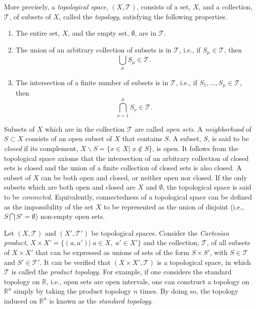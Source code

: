 \documentclass[
12pt,		%
openright,	%
twoside,  %
a4paper,			%
chapter=TITLE,		%
english,			%
french,				%
spanish,			%
brazil				%
]{USPSC-classe/USPSC}
\begin{document}
\begin{apendicesenv}
More precisely, a \textit{topological space}, $(X,\mathscr{T})$, consists of a set, $X$, and a collection, $\mathscr{T}$, of subsets of $X$, called the \textit{topology}, satisfying the following properties.
\begin{enumerate}
    \item[(1)] The entire set, $X$, and the empty set, $\emptyset$, are in $\mathscr{T}$.
    \item[(2)] The union of an arbitrary collection of subsets is in $\mathscr{T}$, i.e., if $S_{\mu}\in\mathscr{T}$, then $$\bigcup_{\mu}S_{\mu}\in\mathscr{T}.$$
    \item[(3)] The intersection of a finite number of subsets is in $\mathscr{T}$, i.e., if $S_1,...,S_{\mu}\in\mathscr{T}$, then $$\bigcap^{\mu}_{\nu=1}S_{\nu}\in\mathscr{T}.$$
\end{enumerate}

Subsets of $X$ which are in the collection $\mathscr{T}$ are called \textit{open sets}. A \textit{neighborhood} of $S\subset X$ consists of an open subset of $X$ that contains $S$. A subset, $S$, is said to be \textit{closed} if its complement, $X\backslash S=\{x\in X|\;x\notin S\}$, is open. It follows from the topological space axioms that the intersection of an arbitrary collection of closed sets is closed and the union of a finite collection of closed sets is also closed. A subset of $X$ can be both open and closed, or neither open nor closed. If the only subsets which are both open and closed are $X$ and $\emptyset$, the topological space is said to be \textit{connected}. Equivalently, connectedness of a topological space can be defined as the impossibility of the set $X$ to be represented as the union of disjoint (i.e., $S\bigcap S'=\emptyset$) non-empty open sets. 

Let $(X,\mathscr{T})$ and $(X',\mathscr{T}')$ be topological spaces. Consider the \textit{Cartesian product}, $X\times X'=\{(a,a')|\;a\in X,\;a'\in X'\}$ and the collection, $\mathcal{T}$, of all subsets of $X\times X'$ that can be expressed as unions of sets of the form $S\times S'$, with $S\in \mathscr{T}$ and $S'\in \mathscr{T}'$. It can be verified that $(X\times X',\mathcal{T})$ is a topological space, in which $\mathcal{T}$ is called the \textit{product topology}. For example, if one considers the standard topology on $\mathbb{R}$, i.e., open sets are open intervals, one can construct a topology on $\mathbb{R}^n$ simply by taking the product topology $n$ times. By doing so, the topology induced on $\mathbb{R}^n$ is known as the \textit{standard topology}.


\end{apendicesenv}
\end{document}
